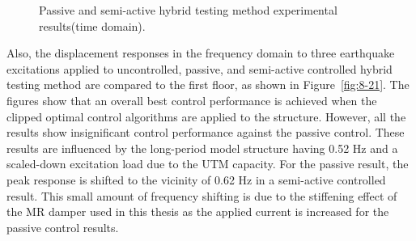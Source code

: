 \begin{figure}[H]
\centering
{}
\caption{Passive and semi-active hybrid testing method experimental results(time domain).}
\label{fig:8-20}
\end{figure}

Also, the displacement responses in the frequency domain to three earthquake excitations applied to uncontrolled, passive, and semi-active controlled hybrid testing method are compared to the first floor, as shown in Figure~\ref{fig:8-21}. The figures show that an overall best control performance is achieved when the clipped optimal control algorithms are applied to the structure. However, all the results show insignificant control performance against the passive control. These results are influenced by the long-period model structure having 0.52 Hz and a scaled-down excitation load due to the UTM capacity. For the passive result, the peak response is shifted to the vicinity of 0.62 Hz in a semi-active controlled result. This small amount of frequency shifting is due to the stiffening effect of the MR damper used in this thesis as the applied current is increased for the passive control results.

